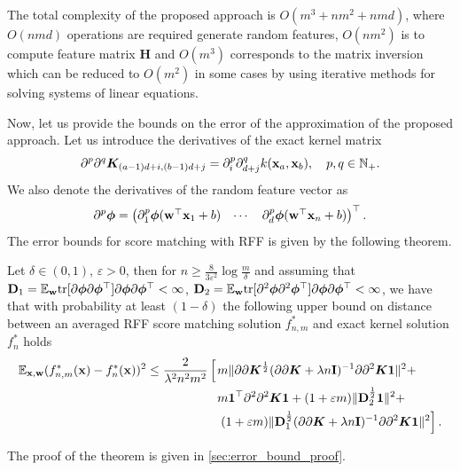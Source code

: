 The total complexity of the proposed approach is $O(m^3 + nm^2 + nmd)$,
where $O(nmd)$ operations are required generate random features,
$O(nm^2)$ is to compute feature matrix ${\bm H}$
and $O(m^3)$ corresponds to the matrix inversion which can be reduced to
$O(m^2)$ in some cases by using iterative methods for solving systems of linear equations.

Now, let us provide the bounds on the error of the approximation of the proposed approach.
Let us introduce the derivatives of the exact kernel matrix
\[
    \partial^p\partial^q {\bm K}_{(a - 1)d + i, (b - 1)d + j} = \partial^p_i\partial^q_{d + j}k({\bf x}_a, {\bf x}_b),
    \quad
    p, q \in \mathbb{N}_+.
\]
We also denote the derivatives of the random feature vector as
\[
   \partial^p\bm{\phi} = \begin{pmatrix}
        \partial_1^p\bm{\phi}({\bf w}^{\top}{\bf x}_1 + b) &
        \cdots &
        \partial^p_d\bm{\phi}({\bf w}^{\top}{\bf x}_n + b)
   \end{pmatrix}^\top.
\]
The error bounds for score matching with RFF is given by the following theorem.
\begin{theorem}
    Let $\delta \in (0, 1)$, $\varepsilon > 0$, then for
    $n \geq \frac{8}{3\varepsilon^2} \log\frac{m}{\delta}$ and assuming that
    ${\bf D}_1 = \mathbb{E}_{\bf w}{\rm tr}[\partial\bm{\phi}\partial\bm{\phi}^{\top}]
    \partial\bm{\phi}\partial\bm{\phi}^{\top} < \infty$, ${\bf D}_2 =
    \mathbb{E}_{\bf w}{\rm tr}[\partial^2\bm{\phi}\partial^2\bm{\phi}^{\top}]\partial\bm{\phi}
    \partial\bm{\phi}^{\top} < \infty$,
    we have that with probability at least $(1 - \delta)$ the following upper bound
    on distance between an averaged RFF score matching solution $f_{n, m}^*$
    and exact kernel solution $f_n^*$ holds
    \begin{align*}
        \mathbb{E}_{{\bf x}, {\bf w}}(f_{n, m}^*({\bf x}) - f_n^*({\bf x}))^2 \leq
        \frac{2}{\lambda^2 n^2 m^2}\left[
            \vphantom{\partial\partial {\bm K}^{\frac{1}{2}}} \right .
            & m\|\partial\partial {\bm K}^{\frac{1}{2}}(\partial\partial {\bm K} + \lambda n{\bf I})^{-1}\partial\partial^2 {\bm K}{\bf 1}\|^2 +\nonumber \\
            &m{\bf 1}^{\top}\partial^2\partial^2{\bm K}{\bf 1} +
            (1 + \varepsilon m)\|{\bf D}_2^{\frac{1}{2}}{\bf 1}\|^2 + \nonumber \\
            &\left . (1 + \varepsilon m)\|{\bf D}_1^{\frac{1}{2}}(\partial\partial {\bm K} + \lambda n {\bf I})^{-1}\partial\partial^2 {\bm K}{\bf 1}\|^2
        \right ].
    \end{align*}
\end{theorem}
The proof of the theorem is given in \ref{sec:error_bound_proof}.

